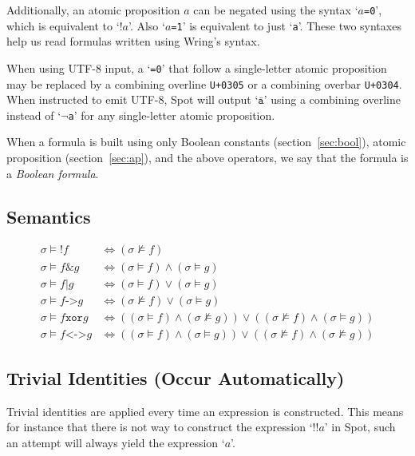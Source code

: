 \documentclass[a4paper,twoside,10pt,DIV=12]{scrreprt}
\newcommand{\uni}[1]{\texttt{\small U+#1}}
\DeclareMathOperator{\NOT}{\texttt{!}}
\newcommand{\XOR}{\mathbin{\texttt{xor}}}
\newcommand{\IMPLIES}{\mathbin{\texttt{->}}}
\newcommand{\EQUIV}{\mathbin{\texttt{<->}}}
\newcommand{\OR}{\mathbin{\texttt{|}}}
\newcommand{\AND}{\mathbin{\texttt{\&}}}
\newcommand{\0}{\texttt{0}}
\newcommand{\1}{\texttt{1}}
\newcommand\samp[1]{`\texttt{#1}'}
\begin{document}
Additionally, an atomic proposition $a$ can be negated using the
syntax \samp{$a$=0}, which is equivalent to \samp{$\NOT a$}.  Also
\samp{$a$=1} is equivalent to just \samp{a}.  These two syntaxes help
us read formulas written using Wring's syntax.

When using UTF-8 input, a \samp{=0} that follow a single-letter atomic
proposition may be replaced by a combining overline \uni{0305} or a
combining overbar \uni{0304}.  When instructed to emit UTF-8, Spot
will output \samp{$\bar{\mathtt{a}}$} using a combining overline
instead of \samp{$\lnot$a} for any single-letter atomic proposition.

\label{def:boolform}
When a formula is built using only Boolean constants
(section~\ref{sec:bool}), atomic proposition (section~\ref{sec:ap}),
and the above operators, we say that the formula is a \emph{Boolean
  formula}.

\subsection{Semantics}

\begin{align*}
\sigma\vDash \NOT f &\iff (\sigma\nvDash f) \\
\sigma\vDash f\AND g &\iff (\sigma\vDash f)\land(\sigma\vDash g) \\
\sigma\vDash f\OR g &\iff (\sigma\vDash f)\lor(\sigma\vDash g) \\
\sigma\vDash f\IMPLIES g &\iff
           (\sigma\nvDash f)\lor(\sigma\vDash g)\\
\sigma\vDash f\XOR g &\iff
           ((\sigma\vDash f)\land(\sigma\nvDash g))\lor
           ((\sigma\nvDash f)\land(\sigma\vDash g))\\
\sigma\vDash f\EQUIV g &\iff
           ((\sigma\vDash f)\land(\sigma\vDash g))\lor
           ((\sigma\nvDash f)\land(\sigma\nvDash g))
\end{align*}

\subsection{Trivial Identities (Occur Automatically)}

Trivial identities are applied every time an expression is
constructed.  This means for instance that there is not way to
construct the expression \samp{$\NOT\NOT a$} in Spot, such an attempt
will always yield the expression \samp{$a$}.

\end{document}
